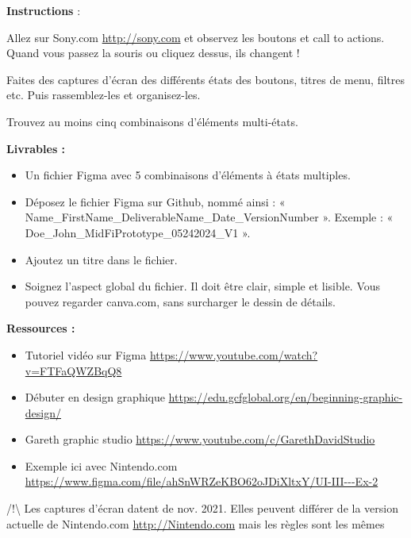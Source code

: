 \makeheaderfiles

\textbf{Instructions} :

Allez sur Sony.com \url{http://sony.com} et observez les boutons et call to actions. Quand vous passez la souris ou cliquez dessus, ils changent !

Faites des captures d'écran des différents états des boutons, titres de menu, filtres etc. Puis rassemblez-les et organisez-les.

Trouvez au moins cinq combinaisons d'éléments multi-états.

\textbf{Livrables :}

\begin{itemize}
\item Un fichier Figma avec 5 combinaisons d'éléments à états multiples.
\item Déposez le fichier Figma sur Github, nommé ainsi : « Name\_FirstName\_DeliverableName\_Date\_VersionNumber ». Exemple : « Doe\_John\_MidFiPrototype\_05242024\_V1 ».
\item Ajoutez un titre dans le fichier.
\item Soignez l'aspect global du fichier. Il doit être clair, simple et lisible. Vous pouvez regarder canva.com, sans surcharger le dessin de détails.
\end{itemize}

\textbf{Ressources :}

\begin{itemize}
\item Tutoriel vidéo sur Figma \url{https://www.youtube.com/watch?v=FTFaQWZBqQ8}
\item Débuter en design graphique \url{https://edu.gcfglobal.org/en/beginning-graphic-design/}
\item Gareth graphic studio \url{https://www.youtube.com/c/GarethDavidStudio}
\item Exemple ici avec Nintendo.com \url{https://www.figma.com/file/ahSnWRZeKBO62oJDiXltxY/UI-III---Ex-2}
\end{itemize}

/!\textbackslash{} Les captures d'écran datent de nov. 2021. Elles peuvent différer de la version actuelle de Nintendo.com \url{http://Nintendo.com} mais les règles sont les mêmes

